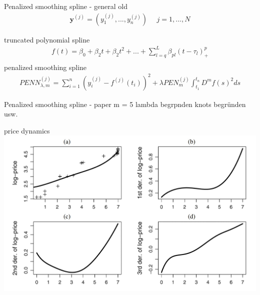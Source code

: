 \documentclass[hyperref={pdfpagelabels=false}]{beamer}
\begin{document}
\begin{frame}{Penalized smoothing spline - general old }
\begin{align*}
\mathbf{y}^{(j)}=(y_1^{(j)},...,y_n^{(j)}) \ \ \ \ \ \     j=1,...,N 
\end{align*}

truncated polynomial spline %
\begin{align*}
f(t)=\beta_0+\beta_2t+\beta_2t^2+...+\sum_{l=q}^L \beta_{pl}(t-\tau_l)^p_+ \\ 
\end{align*}
penalized smoothing spline %
\begin{align*}
PENN^{(j)}_{\lambda,m}=\sum_{i=1}^n (y_i^{(j)}-f^{(j)}(t_i))^2+\lambda PEN^{(j)}_m \int_{t_1}^{t_n}D^mf(s)^2 ds %
\end{align*}
\end{frame}


\begin{frame}{Penalized smoothing spline - paper}
m = 5 lambda begrpnden knots begründen usw.
\end{frame}





\begin{frame}{price dynamics} %
\center
\includegraphics[width=1\textwidth]{smooth_velocity} %
\end{frame}
\end{document}
